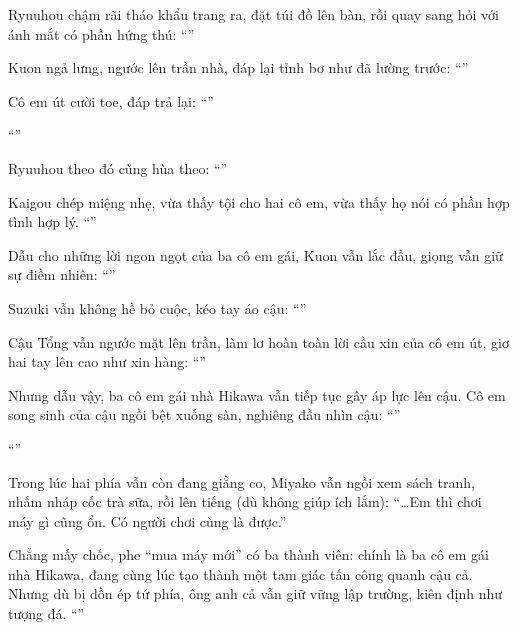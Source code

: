 \documentclass[../main.tex]{subfiles}
\begin{document}
Ryuuhou chậm rãi tháo khẩu trang ra, đặt túi đồ lên bàn, rồi quay sang hỏi với ánh mắt có phần hứng thú: ``''

Kuon ngả lưng, ngước lên trần nhà, đáp lại tỉnh bơ như đã lường trước: ``''

Cô em út cười toe, đáp trả lại: ``''

``''

Ryuuhou theo đó cũng hùa theo: ``''

Kaigou chép miệng nhẹ, vừa thấy tội cho hai cô em, vừa thấy họ nói có phần hợp tình hợp lý. ``''

Dẫu cho những lời ngon ngọt của ba cô em gái, Kuon vẫn lắc đầu, giọng vẫn giữ sự điềm nhiên: ``''

Suzuki vẫn không hề bỏ cuộc, kéo tay áo cậu: ``''

Cậu Tổng vẫn ngước mặt lên trần, làm lơ hoàn toàn lời cầu xin của cô em út, giơ hai tay lên cao như xin hàng: ``''

Nhưng dẫu vậy, ba cô em gái nhà Hikawa vẫn tiếp tục gây áp lực lên cậu. Cô em song sinh của cậu ngồi bệt xuống sàn, nghiêng đầu nhìn cậu: ``''

``''

Trong lúc hai phía vẫn còn đang giằng co, Miyako vẫn ngồi xem sách tranh, nhấm nháp cốc trà sữa, rồi lên tiếng (dù không giúp ích lắm): ``\dots Em thì chơi máy gì cũng ổn. Có người chơi cùng là được.''

Chẳng mấy chốc, phe ``mua máy mới'' có ba thành viên: chính là ba cô em gái nhà Hikawa, đang cùng lúc tạo thành một tam giác tấn công quanh cậu cả. Nhưng dù bị dồn ép tứ phía, ông anh cả vẫn giữ vững lập trường, kiên định như tượng đá. ``''
\end{document}
